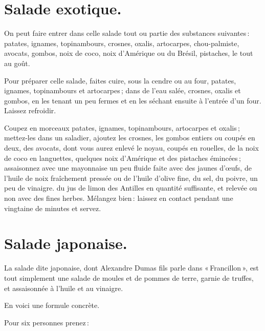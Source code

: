 \section*{\centering Salade exotique.}
{}

On peut faire entrer dans celle salade tout ou partie des substances
suivantes : patates, ignames, topinambours, crosnes, oxalis, artocarpes,
chou-palmiste, avocats, gombos, noix de coco, noix d'Amérique ou du Brésil,
pistaches, le tout au goût.

Pour préparer celle salade, faites cuire, sous la cendre ou au four, patates,
ignames, topinambours et artocarpes ; dans de l'eau salée, crosnes, oxalis et
gombos, en les tenant un peu fermes et en les séchant ensuite à l'entrée d'un
four. Laissez refroidir.

Coupez en morceaux patates, ignames, topinambours, artocarpes et oxalis ;
mettez-les dans un saladier, ajoutez les crosnes, les gombos entiers ou coupés
en deux, des avocats, dont vous aurez enlevé le noyau, coupés en rouelles, de
la noix de coco en languettes, quelques noix d'Amérique et des pistaches
émincées ; assaisonnez avec une mayonnaise un peu fluide faite avec des jaunes
d'œufs, de l'huile de noix fraîchement pressée ou de l'huile d'olive fine, du
sel, du poivre, un peu de vinaigre. du jus de limon des Antilles en quantité
suffisante, et relevée ou non avec des fines herbes. Mélangez bien : laissez en
contact pendant une vingtaine de minutes et servez.

\section*{\centering Salade japonaise.}
{}

La salade dite japonaise, dont Alexandre Dumas fils parle dans « Francillon »,
est tout simplement une salade de moules et de pommes de terre, garnie de
truffes, et assaisonnée à l'huile et au vinaigre.

\medskip

En voici une formule concrète.

\medskip

Pour six personnes prenez :


